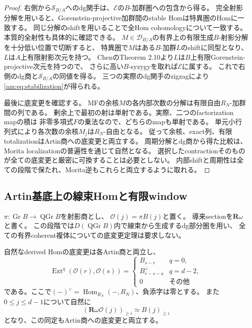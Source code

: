 \begin{proof}
右側から$\mathcal S_{B/A}$へのdg関手は、$\mathcal E$の$B$-加群圏への包含から得る。
完全射影分解を用いると、Gorenstein-projective加群間のstable Homは特異圏のHomに一致する。
同じ分解のshiftを用いることで全Hom cohomologyについて一致する。
本質的全射性も具体的に確認できる。
$M\in\mathcal D_{B/A}$の有界上の有限生成$B$-射影分解を十分低い位置で切断すると、
特異圏で$M$はある$B$-加群$L$のshiftに同型となり、$L$は$A$上有限射影次元を持つ。
ChenのTheorem 2.10より$L$は$B$上有限Gorenstein-projective次元を持つので、
さらに高い$B$-syzygyを取れば$\mathcal E$に属する。
これで右側のdg商と$\mathcal S_{B/A}$の同値を得る。
三つの実際のdg関手のzigzagにより\eqref{am:eq:stabilization}が得られる。

最後に底変更を確認する。
MFの余核$M$の各内部次数の分解は有限自由$R_N$-加群間の列である。
剰余上で最初の射は単射である。実際、二つのfactorization mapの積は
非零多項式$F$の乗法なので、どちらのmapも単射である。
単元小行列式により各次数の余核$M_j$は$R_N$-自由となる。
従って余核、exact列、有限totalizationはArtin商への底変更と両立する。
周期分解とdg商から得た比較は、Morita localizationの普遍性を通じて自然となる。
選択したcontractionそのものが全ての底変更と厳密に可換することは必要としない。
内部shiftと周期性は全ての段階で保たれ、Morita逆もこれらと両立するように取れる。
\end{proof}

\subsection{Artin基底上の線束Homと有限window}

$\pi:\operatorname{Gr}B\to\operatorname{QGr}B$を射影商とし、
$\mathcal O(j)=\pi B(j)$と置く。
導来sectionを$\mathbf R\omega$と書く。
この段階では$D(\operatorname{QGr}B)$内で線束から生成するdg部分圏を用い、
全ての有界coherent複体についての底変更定理は要求しない。

\begin{lemma}[線束のsectionと底変更]\label{am:lem:line-bundles}
自然なderived Homの底変更は各Artin商と両立し、
\begin{equation}\label{am:eq:line-hom}
 \operatorname{Ext}^q(\mathcal O(r),\mathcal O(s))=
 \begin{cases}
 B_{s-r}&q=0,\\
 B_{r-s-a}^{\vee}&q=d-2,\\
 0&\text{その他}
 \end{cases}
\end{equation}
である。ここで$(-)^\vee=\operatorname{Hom}_{R_N}(-,R_N)$、負添字は零とする。
また$0\le j\le d-1$について自然に
\begin{equation}\label{am:eq:window-sections}
 (\mathbf R\omega\mathcal O(j))_{\ge i}\simeq B(j)_{\ge i}
\end{equation}
となり、この同定もArtin商への底変更と両立する。
\end{lemma}

